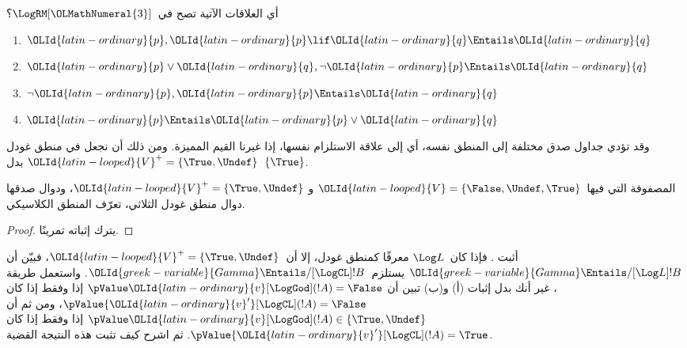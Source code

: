 \documentclass[../../../include/open-logic-section]{subfiles}
\begin{document}
\begin{prob}
  أي العلاقات الآتية تصح في~$\LogRM[\OLMathNumeral{3}]$؟
  \begin{enumerate}
    \item $\OLId{latin-ordinary}{p}, \OLId{latin-ordinary}{p} \lif \OLId{latin-ordinary}{q} \Entails \OLId{latin-ordinary}{q}$
    \item $\OLId{latin-ordinary}{p} \lor \OLId{latin-ordinary}{q}, \lnot \OLId{latin-ordinary}{p} \Entails \OLId{latin-ordinary}{q}$
    \item $\lnot \OLId{latin-ordinary}{p}, \OLId{latin-ordinary}{p} \Entails \OLId{latin-ordinary}{q}$
    \item $\OLId{latin-ordinary}{p} \Entails \OLId{latin-ordinary}{p} \lor \OLId{latin-ordinary}{q}$
  \end{enumerate}
\end{prob}

وقد تؤدي جداول صدق مختلفة إلى المنطق نفسه، أي إلى علاقة الاستلزام
نفسها، إذا غيرنا القيم المميزة. ومن ذلك أن نجعل في منطق غودل
$\OLId{latin-looped}{V}^+ = \{\True, \Undef\}$ بدل~$\{\True\}$.

\begin{prop}
  المصفوفة التي فيها~$\OLId{latin-looped}{V} = \{\False, \Undef,\True\}$ و
  $\OLId{latin-looped}{V}^+=\{\True, \Undef\}$، ودوال صدقها دوال منطق غودل الثلاثي،
  تعرّف المنطق الكلاسيكي.
\end{prop}

\begin{proof}
  يترك إثباته تمرينًا.
\end{proof}

\begin{prob}
  أثبت . فإذا كان~$\Log L$
  معرفًا كمنطق غودل، إلا أن~$\OLId{latin-looped}{V}^+=\{\True,\Undef\}$، فبيّن أن
  $\OLId{greek-variable}{Gamma} \Entails/[\Log L] !B$ يستلزم~$\OLId{greek-variable}{Gamma} \Entails/[\LogCL] !B$.
  واستعمل طريقة ، غير أنك بدل
  إثبات (أ) و(ب) تبين أن
  $\pValue \OLId{latin-ordinary}{v}[\LogGod](!A) = \False$ إذا وفقط إذا كان
  $\pValue {\OLId{latin-ordinary}{v}'}[\LogCL](!A) = \False$، ومن ثم أن
  $\pValue \OLId{latin-ordinary}{v}[\LogGod](!A) \in \{\True,\Undef\}$ إذا وفقط إذا كان
  $\pValue {\OLId{latin-ordinary}{v}'}[\LogCL](!A) = \True$. ثم اشرح كيف تثبت هذه النتيجة
  القضية.
\end{prob}
\end{document}
